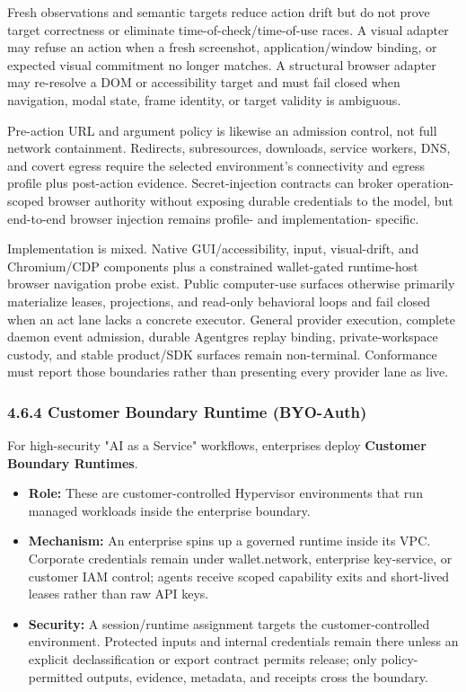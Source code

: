 \documentclass[
  11pt,
]{article}
\providecommand{\tightlist}{%
  \setlength{\itemsep}{0pt}\setlength{\parskip}{0pt}}
\begin{document}
Fresh observations and semantic targets reduce action drift but do not prove
target correctness or eliminate time-of-check/time-of-use races. A visual
adapter may refuse an action when a fresh screenshot, application/window
binding, or expected visual commitment no longer matches. A structural browser
adapter may re-resolve a DOM or accessibility target and must fail closed when
navigation, modal state, frame identity, or target validity is ambiguous.

Pre-action URL and argument policy is likewise an admission control, not full
network containment. Redirects, subresources, downloads, service workers, DNS,
and covert egress require the selected environment's connectivity and egress
profile plus post-action evidence. Secret-injection contracts can broker
operation-scoped browser authority without exposing durable credentials to the
model, but end-to-end browser injection remains profile- and implementation-
specific.

Implementation is mixed. Native GUI/accessibility, input, visual-drift, and
Chromium/CDP components plus a constrained wallet-gated runtime-host browser
navigation probe exist. Public computer-use surfaces otherwise primarily
materialize leases, projections, and read-only behavioral loops and fail closed
when an act lane lacks a concrete executor. General provider execution,
complete daemon event admission, durable Agentgres replay binding,
private-workspace custody, and stable product/SDK surfaces remain non-terminal.
Conformance must report those boundaries rather than presenting every provider
lane as live.

\hypertarget{the-enterprise-gateway-node-byo-auth}{%
\subsubsection{4.6.4 Customer Boundary Runtime
(BYO-Auth)}\label{the-enterprise-gateway-node-byo-auth}}

For high-security "AI as a Service" workflows, enterprises deploy
\textbf{Customer Boundary Runtimes}.

\begin{itemize}
\tightlist
\item
  \textbf{Role:} These are customer-controlled Hypervisor environments
  that run managed workloads inside the enterprise boundary.
\item
  \textbf{Mechanism:} An enterprise spins up a governed runtime inside
  its VPC. Corporate credentials remain under wallet.network,
  enterprise key-service, or customer IAM control; agents receive scoped
  capability exits and short-lived leases rather than raw API keys.
\item
  \textbf{Security:} A session/runtime assignment targets the
  customer-controlled environment. Protected inputs and internal credentials
  remain there unless an explicit declassification or export contract permits
  release; only policy-permitted outputs, evidence, metadata, and receipts cross
  the boundary.
\end{itemize}
\end{document}
